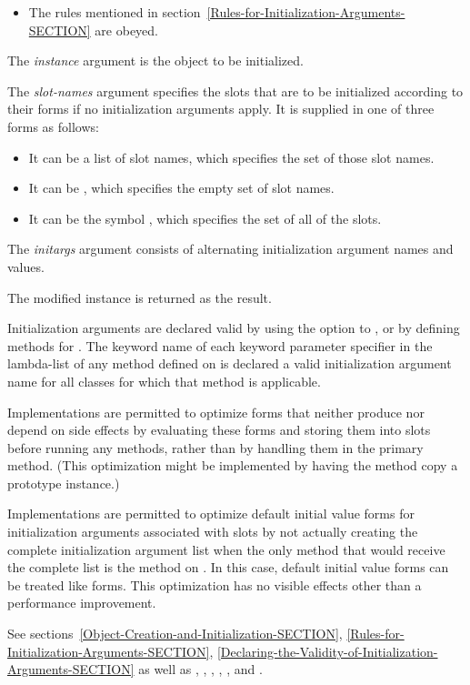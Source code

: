 \begin{defun}
\begin{itemize}
\item  The rules mentioned in
  section~\ref{Rules-for-Initialization-Arguments-SECTION} are obeyed.
\end{itemize}

The \emph{instance} argument is the object to be initialized.

The \emph{slot-names} argument specifies the slots that are to be
initialized according to their  forms if no
initialization arguments apply.  It is supplied in one of three forms
as follows:

\begin{itemize}

\item  It can be a list of slot names, which specifies
the set of those slot names.

\item  It can be , which specifies the empty set of
slot names.

\item  It can be the symbol , which specifies the set of
all of the slots.
\end{itemize}

The \emph{initargs} argument consists of alternating initialization 
argument names and values.

The modified instance is returned as the result.

Initialization arguments are declared valid by using the 
 option to , or by defining methods for 
.  The keyword name of each keyword parameter
specifier in the lambda-list of any method defined on 
 is declared a valid initialization argument
name for all classes for which that method is applicable.

Implementations are permitted to optimize  forms that 
neither produce nor depend on side effects by evaluating these forms
and storing them into slots before running any 
 methods, rather than by handling them in the
primary  method.  (This optimization might
be implemented by having the  method copy a
prototype instance.)

Implementations are permitted to optimize default initial value forms
for initialization arguments associated with slots by not actually
creating the complete initialization argument list when the only method
that would receive the complete list is the method on 
.  In this case, default initial value forms can be 
treated like  forms.  This optimization has no visible
effects other than a performance improvement.

See sections~\ref{Object-Creation-and-Initialization-SECTION},
\ref{Rules-for-Initialization-Arguments-SECTION},
\ref{Declaring-the-Validity-of-Initialization-Arguments-SECTION} as well as
,
,
,
,
,
and .
\end{defun}


